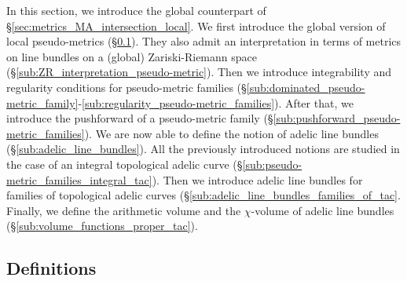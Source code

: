 \documentclass [11pt,reqno]{amsart}
\newcommand{\1}{\mathmybb{1}}
\begin{document}
In this section, we introduce the global counterpart of \S \ref{sec:metrics_MA_intersection_local}. We first introduce the global version of local pseudo-metrics (\S \ref{sub:pseudo-metric_families_definitions}). They also admit an interpretation in terms of metrics on line bundles on a (global) Zariski-Riemann space (\S \ref{sub:ZR_interpretation_pseudo-metric}). Then we introduce integrability and regularity conditions for pseudo-metric families (\S \ref{sub:dominated_pseudo-metric_family}-\ref{sub:regularity_pseudo-metric_families}). After that, we introduce the pushforward of a pseudo-metric family (\S \ref{sub:pushforward_pseudo-metric_families}). We are now able to define the notion of adelic line bundles (\S \ref{sub:adelic_line_bundles}). All the previously introduced notions are studied in the case of an integral topological adelic curve (\S \ref{sub:pseudo-metric_families_integral_tac}). Then we introduce adelic line bundles for families of topological adelic curves (\S \ref{sub:adelic_line_bundles_families_of_tac}.  Finally, we define the arithmetic volume and the $\chi$-volume of adelic line bundles (\S \ref{sub:volume_functions_proper_tac}).
 
\subsection{Definitions}
\label{sub:pseudo-metric_families_definitions}
\end{document}
